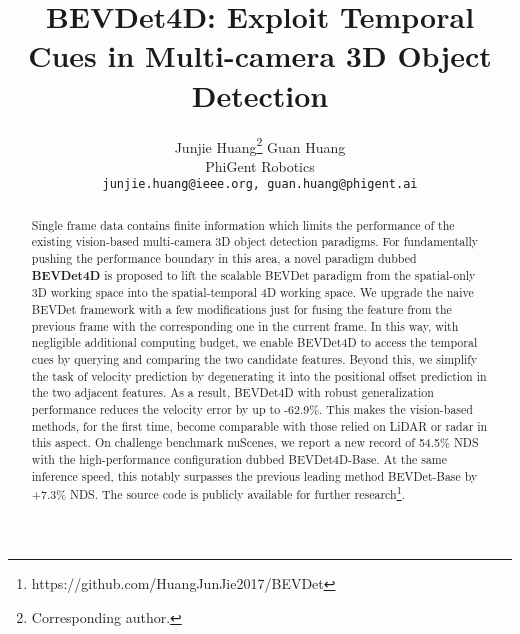 \documentclass[10pt,twocolumn,letterpaper]{article}
\begin{document}
\title{BEVDet4D: Exploit Temporal Cues in Multi-camera 3D Object Detection}

\author{Junjie Huang\thanks{Corresponding author.} \quad Guan Huang \\
       PhiGent Robotics\\
       {\tt\small junjie.huang@ieee.org, guan.huang@phigent.ai}
}

\maketitle


\begin{abstract}
Single frame data contains finite information which limits the performance of the existing vision-based multi-camera 3D object detection paradigms. For fundamentally pushing the performance boundary in this area, a novel paradigm dubbed \textbf{BEVDet4D} is proposed to lift the scalable BEVDet paradigm from the spatial-only 3D working space into the spatial-temporal 4D working space. We upgrade the naive BEVDet framework with a few modifications just for fusing the feature from the previous frame with the corresponding one in the current frame. In this way, with negligible additional computing budget, we enable BEVDet4D to access the temporal cues by querying and comparing the two candidate features. Beyond this, we simplify the task of velocity prediction by degenerating it into the positional offset prediction in the two adjacent features. As a result, BEVDet4D with robust generalization performance reduces the velocity error by up to -62.9\%. This makes the vision-based methods, for the first time, become comparable with those relied on LiDAR or radar in this aspect. On challenge benchmark nuScenes, we report a new record of 54.5\% NDS with the high-performance configuration dubbed BEVDet4D-Base. At the same inference speed, this notably surpasses the previous leading method BEVDet-Base by +7.3\% NDS. The source code is publicly available for further research\footnote {https://github.com/HuangJunJie2017/BEVDet}.
\end{abstract}
\end{document}
